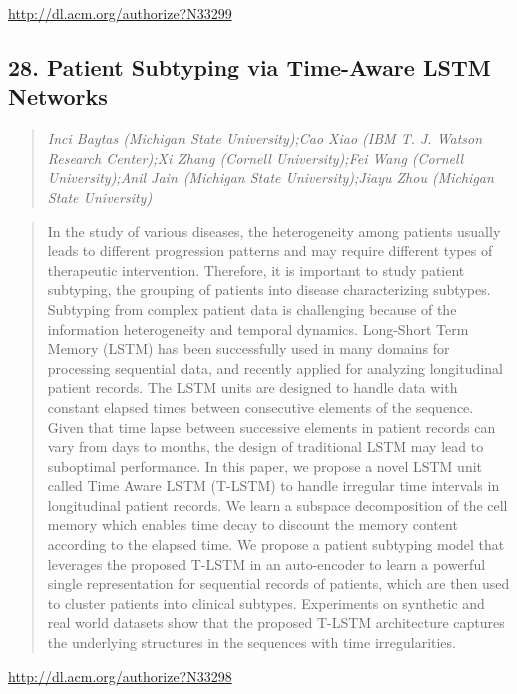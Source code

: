 \documentclass{article}
\begin{document}
\href{http://dl.acm.org/authorize?N33299}{http://dl.acm.org/authorize?N33299}

\subsection{28. Patient Subtyping via Time-Aware LSTM Networks}

\begin{quote}
\footnotesize{\textit{Inci Baytas (Michigan State University);Cao Xiao (IBM T. J. Watson Research Center);Xi Zhang (Cornell University);Fei Wang (Cornell University);Anil Jain (Michigan State University);Jiayu Zhou (Michigan State University)}}

\end{quote}

\begin{quote}
In the study of various diseases, the heterogeneity among patients usually leads to different progression patterns and may require different types of therapeutic intervention. Therefore, it is important to study patient subtyping, the grouping of patients into disease characterizing subtypes. Subtyping from complex patient data is challenging because of the information heterogeneity and temporal dynamics. Long-Short Term Memory (LSTM) has been successfully used in many domains for processing sequential data, and recently applied for analyzing longitudinal patient records. The LSTM units are designed to handle data with constant elapsed times between consecutive elements of the sequence. Given that time lapse between successive elements in patient records can vary from days to months, the design of traditional LSTM may lead to suboptimal performance. In this paper, we propose a novel LSTM unit called Time Aware LSTM (T-LSTM) to handle irregular time intervals in longitudinal patient records. We learn a subspace decomposition of the cell memory which enables time decay to discount the memory content according to the elapsed time. We propose a patient subtyping model that leverages the proposed T-LSTM in an auto-encoder to learn a powerful single representation for sequential records of patients, which are then used to cluster patients into clinical subtypes. Experiments on synthetic and real world datasets show that the proposed T-LSTM architecture captures the underlying structures in the sequences with time irregularities.
\end{quote}

\href{http://dl.acm.org/authorize?N33298}{http://dl.acm.org/authorize?N33298}
\end{document}
